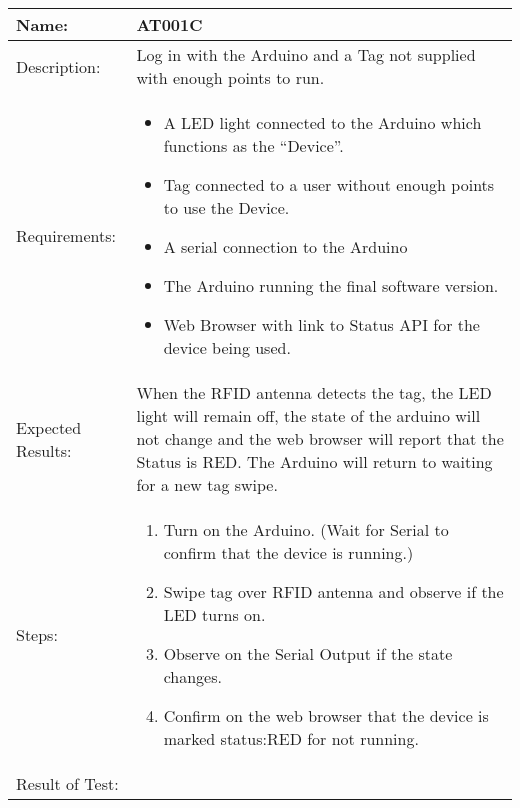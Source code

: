 \begin{table}[h]
	\centering
		\begin{tabular*}{\textwidth}{|l|l|}
		\hline
		\hline
		Name: & AT001C\\
		\hline
		Description: & Log in with the Arduino and a Tag not supplied with enough points to run.\\
		\hline
		Requirements: & \parbox{0.85\textwidth}{
		\begin{itemize}
		  \item A LED light connected to the Arduino which functions as the ``Device''.
			\item Tag connected to a user without enough points to use the Device.
			\item A serial connection to the Arduino
			\item The Arduino running the final software version.
			\item Web Browser with link to Status API for the device being used.
		\end{itemize}}
		\\
		\hline
		Expected Results: & \parbox{.85\textwidth}{When the RFID antenna detects the tag, the LED light will remain off, the state of the arduino will not change and the web browser will report that the Status is RED.		
		The Arduino will return to waiting for a new tag swipe.}\\
		\hline
		Steps: & \parbox{.85\textwidth}{
		\begin{enumerate}
			\item Turn on the Arduino. (Wait for Serial to confirm that the device is running.)
			\item Swipe tag over RFID antenna and observe if the LED turns on.
			\item Observe on the Serial Output if the state changes.
			\item Confirm on the web browser that the device is marked status:RED for not running.
		\end{enumerate}}
		\\
		\hline
		Result of Test: & \\
		\hline
		\end{tabular*}
\end{table}

